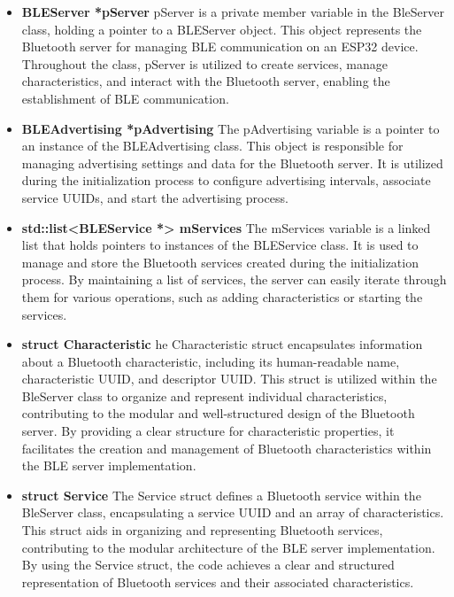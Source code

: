 \begin{itemize}
	\item \textbf{BLEServer *pServer}
	\newline
	pServer is a private member variable in the BleServer class, holding a pointer to a BLEServer object. 
	This object represents the Bluetooth server for managing BLE communication on an ESP32 device. 
	Throughout the class, pServer is utilized to create services, manage characteristics, and interact with the Bluetooth server, enabling the establishment of BLE communication.
	
	\item \textbf{BLEAdvertising *pAdvertising}
	\newline
	The pAdvertising variable is a pointer to an instance of the BLEAdvertising class. 
	This object is responsible for managing advertising settings and data for the Bluetooth server. 
	It is utilized during the initialization process to configure advertising intervals, associate service UUIDs, and start the advertising process. 

	\item \textbf{std::list<BLEService *> mServices}
	\newline
	The mServices variable is a linked list that holds pointers to instances of the BLEService class. 
	It is used to manage and store the Bluetooth services created during the initialization process. 
	By maintaining a list of services, the server can easily iterate through them for various operations, such as adding characteristics or starting the services. 
	
	\item \textbf{struct Characteristic}
	\newline
	he Characteristic struct encapsulates information about a Bluetooth characteristic, including its human-readable name, characteristic UUID, and descriptor UUID. 
	This struct is utilized within the BleServer class to organize and represent individual characteristics, contributing to the modular and well-structured design of the Bluetooth server. 
	By providing a clear structure for characteristic properties, it facilitates the creation and management of Bluetooth characteristics within the BLE server implementation.
	
	\item \textbf{struct Service}
	\newline
	The Service struct defines a Bluetooth service within the BleServer class, encapsulating a service UUID and an array of characteristics. 
	This struct aids in organizing and representing Bluetooth services, contributing to the modular architecture of the BLE server implementation. 
	By using the Service struct, the code achieves a clear and structured representation of Bluetooth services and their associated characteristics. 
	

\end{itemize}
